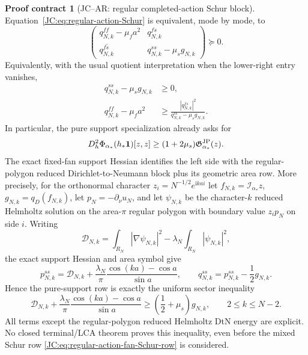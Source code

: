 \documentclass[11pt]{amsart}
\providecommand{\mathscr}{\mathcal}
\numberwithin{equation}{section}
\theoremstyle{definition}
\newtheorem{contract}[theorem]{Proof contract}
\theoremstyle{remark}
\newcommand{\Gjp}{\mathfrak G^{\rm JP}}
\providecommand{\mathscr}[1]{\mathcal{#1}}
\begin{document}
\begin{contract}[JC--AR: regular completed-action Schur block]
Equation~\eqref{JC:eq:regular-action-Schur} is equivalent, mode by mode, to
\begin{equation}\label{JC:eq:regular-action-mode-matrix}
 \boxed{
 \begin{pmatrix}
  q^{ff}_{N,k}-\mu_fa^2&q^{fs}_{N,k}\\
  \overline{q^{fs}_{N,k}}&q^{ss}_{N,k}-\mu_sg_{N,k}
 \end{pmatrix}\succeq0.}
\end{equation}
Equivalently, with the usual quotient interpretation when the lower-right
entry vanishes,
\begin{align}
 q^{ss}_{N,k}-\mu_sg_{N,k}&\ge0,
 \label{JC:eq:regular-action-support-row}\\
 q^{ff}_{N,k}-\mu_fa^2
 &\ge\frac{|q^{fs}_{N,k}|^2}
 {q^{ss}_{N,k}-\mu_sg_{N,k}}.
 \label{JC:eq:regular-action-fan-Schur-row}
\end{align}
In particular, the pure support specialization already asks for
\begin{equation}\label{JC:eq:regular-action-support-gap}
 D_h^2\Phi_{\alpha_*}(h_*\mathbf1)[z,z]
 \ge(1+2\mu_s)\Gjp_{\alpha_*}(z).
\end{equation}
The exact fixed-fan support Hessian identifies the left side with the
regular-polygon reduced Dirichlet-to-Neumann block plus its geometric
area row.  More precisely, for the orthonormal character
$z_i=N^{-1/2}e^{\mathrm i k a i}$ let
$f_{N,k}=\mathcal I_{\alpha_*}z$,
$g_{N,k}=q_D(f_{N,k})$, let $p_N=-\partial_\nu u_N$, and let
$\psi_{N,k}$ be the character-$k$ reduced Helmholtz solution on the
area-$\pi$ regular polygon with boundary value $z_ip_N$ on side $i$.
Writing
\[
 \mathscr D_{N,k}=\int_{R_N}|\nabla\psi_{N,k}|^2
 -\lambda_N\int_{R_N}|\psi_{N,k}|^2,
\]
the exact support Hessian and area symbol give
\begin{equation}\label{JC:eq:regular-support-DtN-sector}
 \boxed{
 p^{ss}_{N,k}=\mathscr D_{N,k}
 +\frac{\lambda_N}{\pi}
   \frac{\cos(ka)-\cos a}{\sin a},
 \qquad
 q^{ss}_{N,k}=p^{ss}_{N,k}-\frac12g_{N,k}.}
\end{equation}
Hence the pure-support row is exactly the uniform sector inequality
\[
 \mathscr D_{N,k}
 +\frac{\lambda_N}{\pi}
   \frac{\cos(ka)-\cos a}{\sin a}
 \ge\left(\frac12+\mu_s\right)g_{N,k},
 \qquad 2\le k\le N-2.
\]
All terms except the regular-polygon reduced Helmholtz DtN energy are
explicit.  No closed terminal/LCA theorem proves this inequality, even
before the mixed Schur row
\eqref{JC:eq:regular-action-fan-Schur-row} is considered.


\end{contract}
\end{document}
